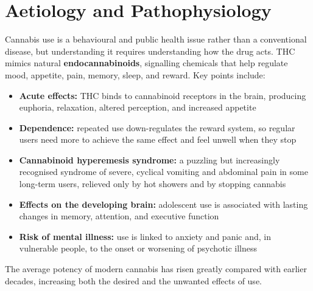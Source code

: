 \section*{Aetiology and Pathophysiology}
Cannabis use is a behavioural and public health issue rather than a conventional disease, but understanding it requires understanding how the drug acts. THC mimics natural \textbf{endocannabinoids}, signalling chemicals that help regulate mood, appetite, pain, memory, sleep, and reward. Key points include:
\begin{itemize}
    \item \textbf{Acute effects:} THC binds to cannabinoid receptors in the brain, producing euphoria, relaxation, altered perception, and increased appetite
    \item \textbf{Dependence:} repeated use down-regulates the reward system, so regular users need more to achieve the same effect and feel unwell when they stop
    \item \textbf{Cannabinoid hyperemesis syndrome:} a puzzling but increasingly recognised syndrome of severe, cyclical vomiting and abdominal pain in some long-term users, relieved only by hot showers and by stopping cannabis
    \item \textbf{Effects on the developing brain:} adolescent use is associated with lasting changes in memory, attention, and executive function
    \item \textbf{Risk of mental illness:} use is linked to anxiety and panic and, in vulnerable people, to the onset or worsening of psychotic illness
\end{itemize}
The average potency of modern cannabis has risen greatly compared with earlier decades, increasing both the desired and the unwanted effects of use.

